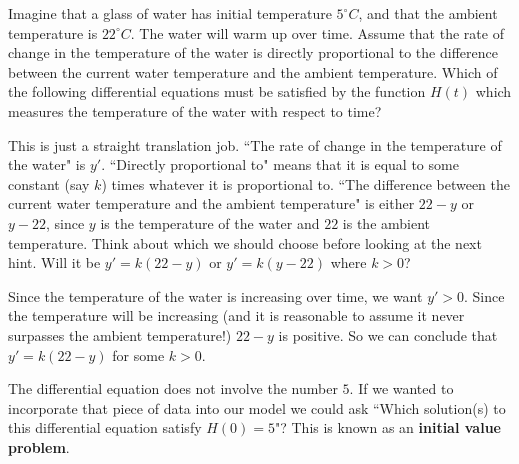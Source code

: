 \documentclass{ximera}
\begin{document}
\begin{question}
  Imagine that a glass of water has initial temperature $5^\circ
  \unit{C}$, and that the ambient temperature is $22^\circ \unit{C}$.
  The water will warm up over time.  Assume that the rate of change in
  the temperature of the water is directly proportional to the
  difference between the current water temperature and the ambient
  temperature.  Which of the following differential equations must be
  satisfied by the function $H(t)$ which measures the temperature of
  the water with respect to time?
	
	\begin{multipleChoice}
	\end{multipleChoice}
	
	\begin{hint}
	  This is just a straight translation job.  ``The rate of change in the temperature of the water" is $y'$.  ``Directly proportional to" means that it is equal to some constant (say $k$) times whatever it is proportional to.  ``The difference between the current water temperature and the ambient temperature" is either $22-y$ or $y-22$, since $y$ is the temperature of the water and $22$ is the ambient temperature.   Think about which we should choose before looking at the next hint.  Will it be $y'=k(22-y)$ or $y'=k(y-22)$ where $k>0$?
	\end{hint}
	
	\begin{hint}
		Since the temperature of the water is increasing over time, we want $y'>0$.  Since the temperature will be increasing (and it is reasonable to assume it never surpasses the ambient temperature!)  $22-y$ is positive.  So we can conclude that $y' = k(22-y)$ for some $k>0$.  
	\end{hint}

	\begin{feedback}
		The differential equation does not involve the number $5$.  If we wanted to incorporate that piece of data into our model we could ask ``Which solution(s) to this differential equation satisfy $H(0) = 5$"?  This is known as an \textbf{initial value problem}. 
	\end{feedback}
\end{question} 
\end{document}
